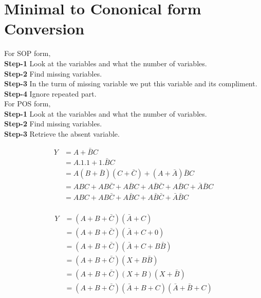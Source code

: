 \documentclass[a4aper,12pt]{report}
\newcounter{examplebox}[chapter]
\begin{document}
 \section{Minimal to Cononical form Conversion }

\par For SOP form$,$ \\
 \textbf{Step-1} Look at the variables and what the number of variables.\\
 \textbf{Step-2} Find missing variables.\\
 \textbf{Step-3} In the turm of missing variable we put this variable and its compliment.\\
 \textbf{Step-4} Ignore repeated part.\\

\vspace{5pt}
 For POS form$,$\\
 \textbf{Step-1} Look at the variables and what the number of variables.\\
 \textbf{Step-2} Find missing variables.\\
 \textbf{Step-3} Retrieve the absent variable.
 \begin{examplebox}[Convert this in cononical form \ensuremath{Y=A+\bar{B}C}]
    \begin{minipage}{0.5\linewidth}
        \begin{align*}
        Y&=A+\bar{B}C\\
        &=A.1.1+1.\bar{B}C\\
        &=A(B+\bar{B})(C+\bar{C})+(A+\bar{A})\bar{B}C\\
        &=ABC+AB\bar{C}+A\bar{B}C+A\bar{B}\bar{C}+A\bar{B}C+\bar{A}\bar{B}C\\
        &=ABC+AB\bar{C}+A\bar{B}C+A\bar{B}\bar{C}+\bar{A}\bar{B}C\\
    \end{align*}

    \end{minipage}
    
    \begin{minipage}{0.5\linewidth}
        \begin{align*}
            Y&= (A+B+\bar{C})(\bar{A}+C)\\
            &= (A+B+\bar{C})(\bar{A}+C+0)\\
            &=(A+B+\bar{C})(\bar{A}+C+B\bar{B})\\
            &=(A+B+\bar{C})(X+B\bar{B})\\
            &=(A+B+\bar{C})(X+B)(X+\bar{B})\\
            &=(A+B+\bar{C})(\bar{A}+B+C)(\bar{A}+\bar{B}+C)
        \end{align*}

    \end{minipage}
 \end{examplebox}
\end{document}
